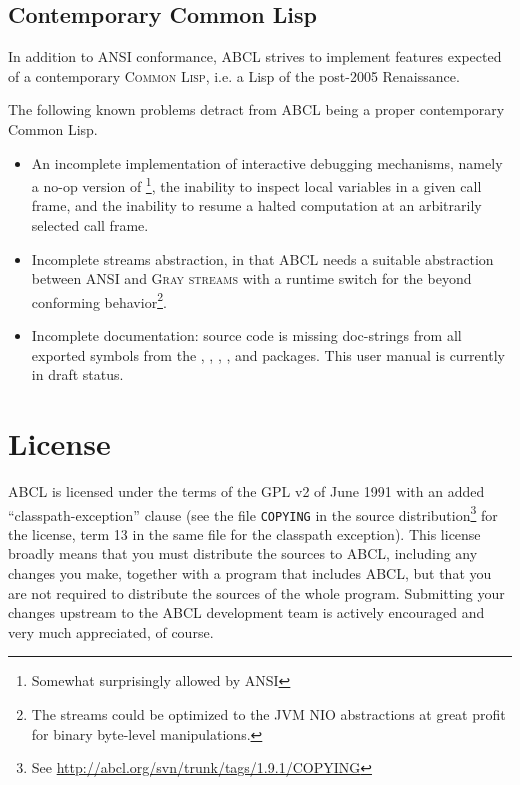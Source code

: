 \documentclass[10pt]{book}
\begin{document}
\subsection{Contemporary Common Lisp}
In addition to \textsc{ANSI} conformance, \textsc{ABCL} strives to implement
features expected of a contemporary \textsc{Common Lisp}, i.e. a Lisp of the
post-2005 Renaissance.

The following known problems detract from \textsc{ABCL} being a proper
contemporary Common Lisp.
\begin{itemize}
\item An incomplete implementation of interactive debugging
  mechanisms, namely a no-op version of \footnote{Somewhat
    surprisingly allowed by \textsc{ANSI}}, the inability to inspect
  local variables in a given call frame, and the inability to resume a
  halted computation at an arbitrarily selected call frame.
\item Incomplete streams abstraction, in that \textsc{ABCL} needs a
  suitable abstraction between \textsc{ANSI} and \textsc{Gray streams}
  with a runtime switch for the beyond conforming
  behavior\footnote{The streams could be optimized to the
    \textsc{JVM} NIO \cite{nio} abstractions at great profit for
    binary byte-level manipulations.}.
\item Incomplete documentation: source code is missing doc-strings from
  all exported symbols from the , ,
  , , and  packages.  This user
  manual is currently in draft status.
\end{itemize}



\section{License}

\textsc{ABCL} is licensed under the terms of the \textsc{GPL} v2 of
June 1991 with an added ``classpath-exception'' clause (see the file
\texttt{COPYING} in the source distribution\footnote{See
  \url{http://abcl.org/svn/trunk/tags/1.9.1/COPYING}} for the license,
term 13 in the same file for the classpath exception).  This license
broadly means that you must distribute the sources to \textsc{ABCL},
including any changes you make, together with a program that includes
\textsc{ABCL}, but that you are not required to distribute the sources
of the whole program.  Submitting your changes upstream to the \textsc{ABCL}
development team is actively encouraged and very much appreciated, of
course.
\end{document}
